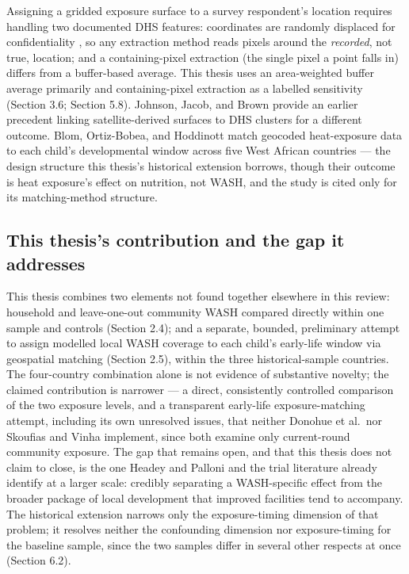 Assigning a gridded exposure surface to a survey respondent's location requires handling two documented DHS features: coordinates are randomly displaced for confidentiality \autocite{Burgert2013,PerezHeydrich2013}, so any extraction method reads pixels around the \emph{recorded}, not true, location; and a containing-pixel extraction (the single pixel a point falls in) differs from a buffer-based average. This thesis uses an area-weighted buffer average primarily and containing-pixel extraction as a labelled sensitivity (Section 3.6; Section 5.8). Johnson, Jacob, and Brown \autocite*{JohnsonJacobBrown2013} provide an earlier precedent linking satellite-derived surfaces to DHS clusters for a different outcome. Blom, Ortiz-Bobea, and Hoddinott \autocite*{Blom2022} match geocoded heat-exposure data to each child's developmental window across five West African countries --- the design structure this thesis's historical extension borrows, though their outcome is heat exposure's effect on nutrition, not WASH, and the study is cited only for its matching-method structure.

\subsection{This thesis's contribution and the gap it addresses}\label{sec:2.6}

This thesis combines two elements not found together elsewhere in this review: household and leave-one-out community WASH compared directly within one sample and controls (Section 2.4); and a separate, bounded, preliminary attempt to assign modelled local WASH coverage to each child's early-life window via geospatial matching (Section 2.5), within the three historical-sample countries. The four-country combination alone is not evidence of substantive novelty; the claimed contribution is narrower --- a direct, consistently controlled comparison of the two exposure levels, and a transparent early-life exposure-matching attempt, including its own unresolved issues, that neither Donohue et al.~nor Skoufias and Vinha implement, since both examine only current-round community exposure. The gap that remains open, and that this thesis does not claim to close, is the one Headey and Palloni and the trial literature already identify at a larger scale: credibly separating a WASH-specific effect from the broader package of local development that improved facilities tend to accompany. The historical extension narrows only the exposure-timing dimension of that problem; it resolves neither the confounding dimension nor exposure-timing for the baseline sample, since the two samples differ in several other respects at once (Section 6.2).
